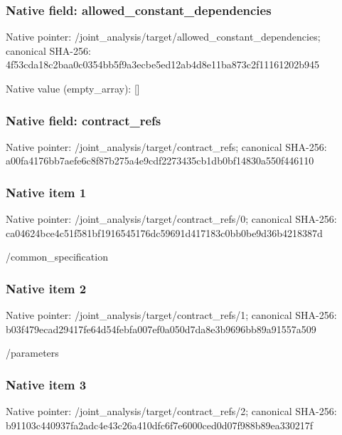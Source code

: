 \documentclass[10pt,a4paper]{article}
\begin{document}
\subsubsection{Native field: allowed\_\allowbreak{}constant\_\allowbreak{}dependencies}
Native pointer: /joint\_\allowbreak{}analysis/target/allowed\_\allowbreak{}constant\_\allowbreak{}dependencies; canonical SHA-256: 4f53cda18c2baa0c0354bb5f9a3ecbe5ed12ab4d8e11ba873c2f11161202b945

Native value (empty\_\allowbreak{}array): []

\subsubsection{Native field: contract\_\allowbreak{}refs}
Native pointer: /joint\_\allowbreak{}analysis/target/contract\_\allowbreak{}refs; canonical SHA-256: a00fa4176bb7aefe6c8f87b275a4e9cdf2273435cb1db0bf14830a550f446110

\subsubsection{Native item 1}
Native pointer: /joint\_\allowbreak{}analysis/target/contract\_\allowbreak{}refs/0; canonical SHA-256: ca04624bce4c51f581bf1916545176dc59691d417183c0bb0be9d36b4218387d

\begingroup\raggedright\sloppy /\allowbreak{}common\_\allowbreak{}specification\par\endgroup

\subsubsection{Native item 2}
Native pointer: /joint\_\allowbreak{}analysis/target/contract\_\allowbreak{}refs/1; canonical SHA-256: b03f479ecad29417fe64d54febfa007ef0a050d7da8e3b9696bb89a91557a509

\begingroup\raggedright\sloppy /\allowbreak{}parameters\par\endgroup

\subsubsection{Native item 3}
Native pointer: /joint\_\allowbreak{}analysis/target/contract\_\allowbreak{}refs/2; canonical SHA-256: b91103c440937fa2adc4e43c26a410dfc6f7e6000ced0d07f988b89ea330217f
\end{document}
